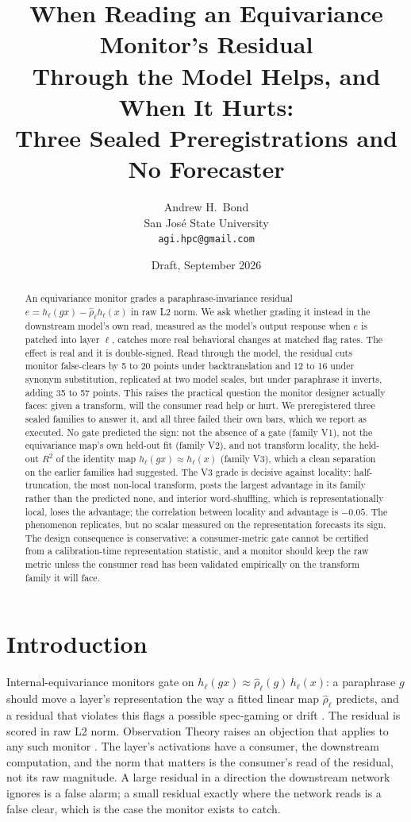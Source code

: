 \documentclass[11pt]{article}
\title{When Reading an Equivariance Monitor's Residual\\ Through the Model Helps, and When It Hurts:\\ Three Sealed Preregistrations and No Forecaster}
\author{Andrew H.\ Bond\\ San Jos\'e State University\\ \texttt{agi.hpc@gmail.com}}
\date{Draft, September 2026}
\begin{document}
\maketitle

\begin{abstract}
An equivariance monitor grades a paraphrase-invariance residual
$e = h_\ell(g x) - \hat\rho_\ell h_\ell(x)$ in raw L2 norm. We ask whether
grading it instead in the downstream model's own read, measured as the model's
output response when $e$ is patched into layer $\ell$, catches more real
behavioral changes at matched flag rates. The effect is real and it is
double-signed. Read through the model, the residual cuts monitor false-clears by
5 to 20 points under backtranslation and 12 to 16 under synonym substitution,
replicated at two model scales, but under paraphrase it inverts, adding 35 to 57
points. This raises the practical question the monitor designer actually faces:
given a transform, will the consumer read help or hurt. We preregistered three
sealed families to answer it, and all three failed their own bars, which we
report as executed. No gate predicted the sign: not the absence of a gate
(family V1), not the equivariance map's own held-out fit (family V2), and not
transform locality, the held-out $R^2$ of the identity map $h_\ell(g x) \approx
h_\ell(x)$ (family V3), which a clean separation on the earlier families had
suggested. The V3 grade is decisive against locality: half-truncation, the most
non-local transform, posts the largest advantage in its family rather than the
predicted none, and interior word-shuffling, which is representationally local,
loses the advantage; the correlation between locality and advantage is
$-0.05$. The phenomenon replicates, but no scalar measured on the representation
forecasts its sign. The design consequence is conservative: a
consumer-metric gate cannot be certified from a calibration-time representation
statistic, and a monitor should keep the raw metric unless the consumer read has
been validated empirically on the transform family it will face.
\end{abstract}

\section{Introduction}

Internal-equivariance monitors gate on $h_\ell(g x) \approx \hat\rho_\ell(g)\,
h_\ell(x)$: a paraphrase $g$ should move a layer's representation the way a
fitted linear map $\hat\rho_\ell$ predicts, and a residual that violates this
flags a possible spec-gaming or drift \cite{ieip2026}. The residual is scored in
raw L2 norm. Observation Theory raises an objection that applies to any such
monitor \cite{turboquant,geoobs}. The
layer's activations have a consumer, the downstream computation, and the norm
that matters is the consumer's read of the residual, not its raw magnitude. A
large residual in a direction the downstream network ignores is a false alarm;
a small residual exactly where the network reads is a false clear, which is the
case the monitor exists to catch.
\end{document}
